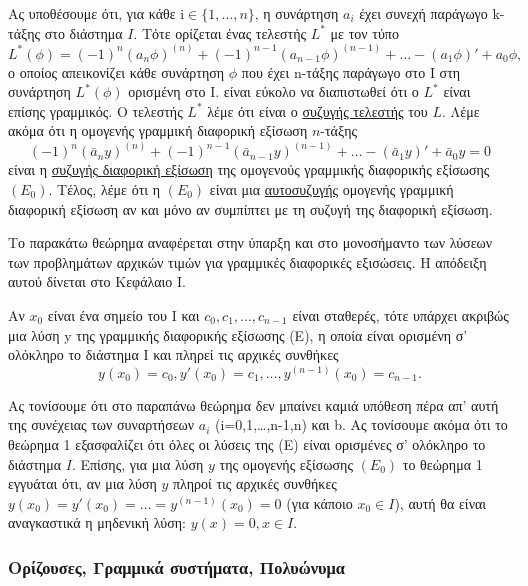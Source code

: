 \documentclass[11pt,a4paper,twoside]{book}
\newcommand{\titlefont}[1]{{\fontfamily{maksf}\selectfont #1}}
\newcounter{thewrhma}[chapter]
\renewcommand{\thethewrhma}{\thechapter.\arabic{thewrhma}}
\newcommand{\thewr}{\refstepcounter{thewrhma}{\bf\titlefont{\textcolor{secondarycolor}{\large Θεώρημα\hspace{2mm}\thethewrhma}}}\hspace{1mm}}{}
\newenvironment{Thewrhma}[1]
{\begin{tcolorbox}[title=\thewr\ \ :\ \  {\textcolor{black}{\bf{\large\titlefont{#1}}}},
breakable,
enhanced standard,
titlerule=-.2pt,
toprule=0pt, 
rightrule=0pt, 
bottomrule=0pt,
colback=white,
left=2mm,
top=1mm,
bottom=0mm,
boxrule=0pt,
colframe=white,
borderline west={1.5mm}{0pt}{secondarycolor},
leftrule=2mm,
sharp corners,
coltitle=secondarycolor]}
{\end{tcolorbox}}
\begin{document}
Ας υποθέσουμε ότι, για κάθε i$\in\{1,\dots,n\}$, η συνάρτηση $a_i$ έχει συνεχή παράγωγο k-τάξης στο διάστημα $Ι$. Τότε ορίζεται ένας τελεστής $L^*$ με τον τύπο
\[
L^*(\phi) = (-1)^n(a_n\phi)^{(n)} + (-1)^{n-1}(a_{n-1}\phi)^{(n-1)} + \dots - (a_1\phi)' + a_0\phi,
\]
ο οποίος απεικονίζει κάθε συνάρτηση $\phi$ που έχει n-τάξης παράγωγο στο Ι στη συνάρτηση $L^*(\phi)$ ορισμένη στο Ι. είναι εύκολο να διαπιστωθεί ότι ο $L^*$ είναι επίσης γραμμικός. Ο τελεστής $L^*$ λέμε ότι είναι ο \underline{συζυγής τελεστής} του $L$. Λέμε ακόμα ότι η ομογενής γραμμική διαφορική εξίσωση $n$-τάξης
\begin{equation*}
(-1)^n(\bar{a}_n y)^{(n)} + (-1)^{n-1}(\bar{a}_{n-1} y)^{(n-1)} + \dots - (\bar{a}_1 y)' + \bar{a}_0 y = 0
\end{equation*}
είναι η \underline{συζυγής διαφορική εξίσωση} της ομογενούς γραμμικής διαφορικής εξίσωσης $(E_0)$. Τέλος, λέμε ότι η $(E_0)$ είναι μια \underline{αυτοσυζυγής} ομογενής γραμμική διαφορική εξίσωση αν και μόνο αν συμπίπτει με τη συζυγή της διαφορική εξίσωση.

Το παρακάτω θεώρημα αναφέρεται στην ύπαρξη και στο μονοσήμαντο των λύσεων των προβλημάτων αρχικών τιμών για γραμμικές διαφορικές εξισώσεις. Η απόδειξη αυτού δίνεται στο Κεφάλαιο Ι.

\begin{Thewrhma}{}
Αν $x_0$ είναι ένα σημείο του Ι και $c_0, c_1, \dots, c_{n-1}$ είναι σταθερές, τότε υπάρχει ακριβώς μια λύση y της γραμμικής διαφορικής εξίσωσης (Ε), η οποία είναι ορισμένη σ' ολόκληρο το διάστημα Ι και πληρεί τις αρχικές συνθήκες
\[
y(x_0)=c_0, y'(x_0)=c_1, \dots, y^{(n-1)}(x_0)=c_{n-1}.
\]
\end{Thewrhma}
Ας τονίσουμε ότι στο παραπάνω θεώρημα δεν μπαίνει καμιά υπόθεση πέρα απ' αυτή της συνέχειας των συναρτήσεων $a_i$ (i=0,1,\dots,n-1,n) και b. Ας τονίσουμε ακόμα ότι το θεώρημα 1 εξασφαλίζει ότι όλες οι λύσεις της (Ε) είναι ορισμένες σ' ολόκληρο το διάστημα $Ι$. Επίσης, για μια λύση $y$ της ομογενής εξίσωσης $(E_0)$ το θεώρημα 1 εγγυάται ότι, αν μια λύση $y$ πληροί τις αρχικές συνθήκες $y(x_0)=y'(x_0)=\dots=y^{(n-1)}(x_0)=0$ (για κάποιο $x_0\in I$), αυτή θα είναι αναγκαστικά η μηδενική λύση: $y(x)=0, x\in I$.
\subsubsection{Ορίζουσες, Γραμμικά συστήματα, Πολυώνυμα}
\end{document}

